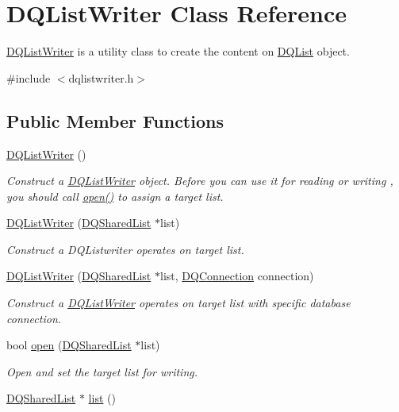 \hypertarget{classDQListWriter}{
\section{DQListWriter Class Reference}
\label{classDQListWriter}
}


\hyperlink{classDQListWriter}{DQListWriter} is a utility class to create the content on \hyperlink{classDQList}{DQList} object.  




{\ttfamily \#include $<$dqlistwriter.h$>$}

\subsection*{Public Member Functions}
\begin{DoxyCompactItemize}
\item 
\hyperlink{classDQListWriter_a8473e70652e6c8d52fa3f95e5bf6a3e1}{DQListWriter} ()
\begin{DoxyCompactList}\small\item\em Construct a \hyperlink{classDQListWriter}{DQListWriter} object. Before you can use it for reading or writing , you should call \hyperlink{classDQListWriter_a110d925f5cb84903546bea90729282f5}{open()} to assign a target list. \item\end{DoxyCompactList}\item 
\hyperlink{classDQListWriter_a5981115ef7a1466815950d7055004fc2}{DQListWriter} (\hyperlink{classDQSharedList}{DQSharedList} $\ast$list)
\begin{DoxyCompactList}\small\item\em Construct a DQListwriter operates on target list. \item\end{DoxyCompactList}\item 
\hyperlink{classDQListWriter_ad0d0605518f8f202dc552b8cee3cdcfe}{DQListWriter} (\hyperlink{classDQSharedList}{DQSharedList} $\ast$list, \hyperlink{classDQConnection}{DQConnection} connection)
\begin{DoxyCompactList}\small\item\em Construct a \hyperlink{classDQListWriter}{DQListWriter} operates on target list with specific database connection. \item\end{DoxyCompactList}\item 
bool \hyperlink{classDQListWriter_a110d925f5cb84903546bea90729282f5}{open} (\hyperlink{classDQSharedList}{DQSharedList} $\ast$list)
\begin{DoxyCompactList}\small\item\em Open and set the target list for writing. \item\end{DoxyCompactList}\item 
\hypertarget{classDQListWriter_a6519ad1ea45a4d3a0573bd6f728e40c8}{
\hyperlink{classDQSharedList}{DQSharedList} $\ast$ \hyperlink{classDQListWriter_a6519ad1ea45a4d3a0573bd6f728e40c8}{list} ()}
\label{classDQListWriter_a6519ad1ea45a4d3a0573bd6f728e40c8}


\end{DoxyCompactItemize}
